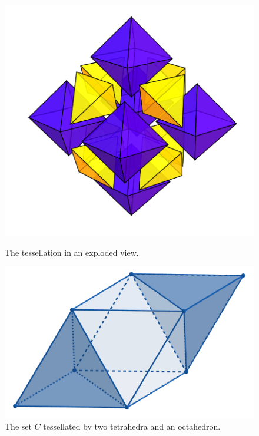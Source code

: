 \documentclass[12pt,a4paper]{article}
\theoremstyle{definition}
\theoremstyle{remark}
\theoremstyle{theorem}
\begin{document}
\begin{figure}
  \centering
  \begin{minipage}{0.45\textwidth}
	  \centering
	  \includegraphics[width=1\textwidth]{Figures/tetra-exploded.PNG}
	  \caption{The tessellation in an exploded view.}
	  \label{fig:explode}
  \end{minipage}\hfill
  \begin{minipage}{0.45\textwidth}
	  \centering
	  \includegraphics[width=1\textwidth]{Figures/tetra-tess.png}
	  \caption{The set $C$ tessellated by two tetrahedra and an octahedron.}
	  \label{fig:tetra-oct}
  \end{minipage}
\end{figure}
\end{document}
